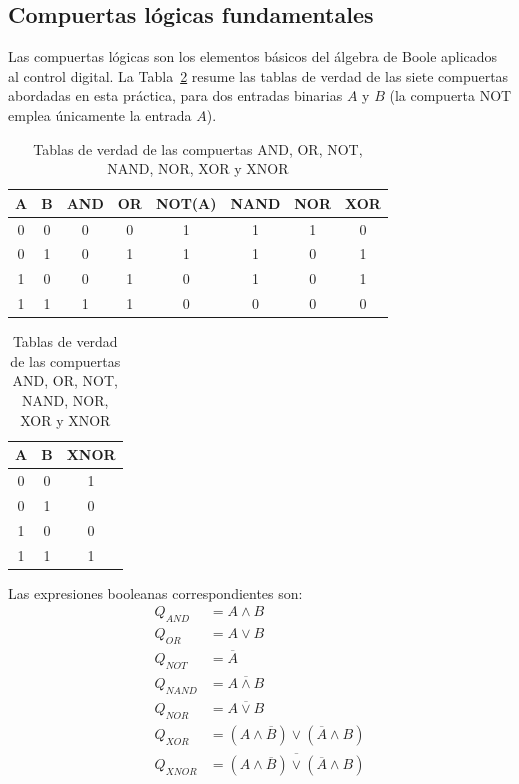 \documentclass[conference]{IEEEtran}
\begin{document}
\subsection*{Compuertas lógicas fundamentales}
Las compuertas lógicas son los elementos básicos del álgebra de Boole aplicados al control digital. La Tabla~\ref{tab:verdad} resume las tablas de verdad de las siete compuertas abordadas en esta práctica, para dos entradas binarias $A$ y $B$ (la compuerta NOT emplea únicamente la entrada $A$).

\begin{table}[H]
\centering
\caption{Tablas de verdad de las compuertas AND, OR, NOT, NAND, NOR, XOR y XNOR}
\label{tab:verdad}
\renewcommand{\arraystretch}{1.15}
\begin{tabular}{|c|c|c|c|c|c|c|c|}
\hline
\textbf{A} & \textbf{B} & \textbf{AND} & \textbf{OR} & \textbf{NOT(A)} & \textbf{NAND} & \textbf{NOR} & \textbf{XOR} \\
\hline
0 & 0 & 0 & 0 & 1 & 1 & 1 & 0 \\ \hline
0 & 1 & 0 & 1 & 1 & 1 & 0 & 1 \\ \hline
1 & 0 & 0 & 1 & 0 & 1 & 0 & 1 \\ \hline
1 & 1 & 1 & 1 & 0 & 0 & 0 & 0 \\ \hline
\end{tabular}

\vspace{4pt}
\begin{tabular}{|c|c|c|}
\hline
\textbf{A} & \textbf{B} & \textbf{XNOR} \\
\hline
0 & 0 & 1 \\ \hline
0 & 1 & 0 \\ \hline
1 & 0 & 0 \\ \hline
1 & 1 & 1 \\ \hline
\end{tabular}
\end{table}

Las expresiones booleanas correspondientes son:
\begin{align}
Q_{AND} &= A \wedge B \label{eq:and}\\
Q_{OR}  &= A \vee B \label{eq:or}\\
Q_{NOT} &= \overline{A} \label{eq:not}\\
Q_{NAND} &= \overline{A \wedge B} \label{eq:nand}\\
Q_{NOR} &= \overline{A \vee B} \label{eq:nor}\\
Q_{XOR} &= (A \wedge \overline{B}) \vee (\overline{A} \wedge B) \label{eq:xor}\\
Q_{XNOR} &= \overline{(A \wedge \overline{B}) \vee (\overline{A} \wedge B)} \label{eq:xnor}
\end{align}
\end{document}
